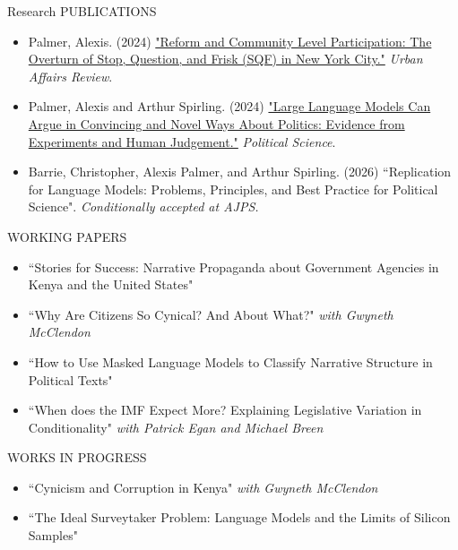 \documentclass{resume} %
\begin{document}
	\begin{rSection}{Research}
		\bigskip
		PUBLICATIONS
		\begin{itemize}
			\item Palmer, Alexis. (2024) \href{https://doi.org/10.1177/10780874241241266}{"Reform and Community Level Participation: The Overturn of Stop, Question, and Frisk (SQF) in New York City."} \textit{Urban Affairs Review}. 
			\item Palmer, Alexis and Arthur Spirling. (2024) \href{https://doi.org/10.1080/00323187.2024.2335471}{"Large Language Models Can Argue in Convincing and Novel Ways About Politics: Evidence from Experiments and Human Judgement."} \textit{Political Science}.  
			\item Barrie, Christopher, Alexis Palmer, and Arthur Spirling. (2026) ``Replication for Language Models: Problems, Principles, and Best Practice for Political Science". \textit{Conditionally accepted at AJPS.}
		\end{itemize}
		\bigskip
		WORKING PAPERS 
		\begin{itemize}
			\item ``Stories for Success: Narrative Propaganda about Government Agencies in Kenya and the United States"
			\item ``Why Are Citizens So Cynical? And About What?" \textit{with Gwyneth McClendon}
			\item ``How to Use Masked Language Models to Classify Narrative Structure in Political Texts"
			\item ``When does the IMF Expect More? Explaining Legislative Variation in Conditionality" \textit{with Patrick Egan and Michael Breen}
		\end{itemize}
		\bigskip
		WORKS IN PROGRESS
		\begin{itemize}
			\item ``Cynicism and Corruption in Kenya" \textit{with Gwyneth McClendon}
			\item ``The Ideal Surveytaker Problem: Language Models and the Limits of Silicon Samples"\\
		\end{itemize}
		

\end{rSection}
\end{document}
